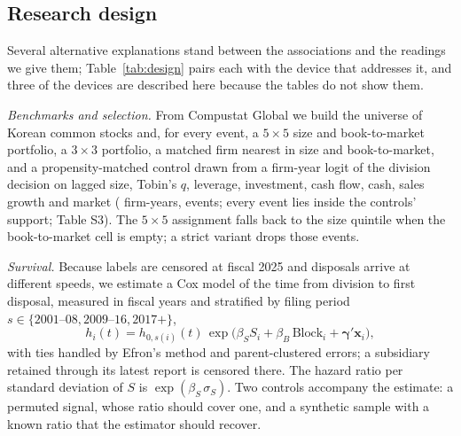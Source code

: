 \subsection{Research design}\label{sec:design}

Several alternative explanations stand between the associations and the readings we give them; Table~\ref{tab:design} pairs each with the device that addresses it, and three of the devices are described here because the tables do not show them.

\emph{Benchmarks and selection.} From Compustat Global we build the universe of Korean common stocks and, for every event, a $5\times5$ size and book-to-market portfolio, a $3\times3$ portfolio, a matched firm nearest in size and book-to-market, and a propensity-matched control drawn from a firm-year logit of the division decision on lagged size, Tobin's $q$, leverage, investment, cash flow, cash, sales growth and market (\SelFirmYears{} firm-years, \SelEvents{} events; every event lies inside the controls' support; Table S3). The $5\times5$ assignment falls back to the size quintile when the book-to-market cell is empty; a strict variant drops those events.

\emph{Survival.} Because labels are censored at fiscal 2025 and disposals arrive at different speeds, we estimate a Cox model of the time from division to first disposal, measured in fiscal years and stratified by filing period $s \in \{2001\text{--}08, 2009\text{--}16, 2017\text{+}\}$,
\begin{equation}\label{eq:cox}
h_i(t) = h_{0,s(i)}(t)\, \exp\!\big(\beta_S S_i + \beta_B\, \mathrm{Block}_i + \boldsymbol{\gamma}'\mathbf{x}_i\big),
\end{equation}
with ties handled by Efron's method and parent-clustered errors; a subsidiary retained through its latest report is censored there. The hazard ratio per standard deviation of $S$ is $\exp(\beta_S\,\sigma_S)$. Two controls accompany the estimate: a permuted signal, whose ratio should cover one, and a synthetic sample with a known ratio that the estimator should recover.

